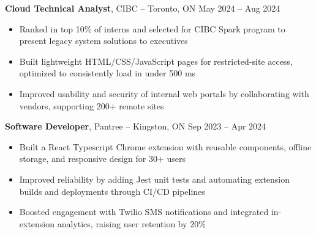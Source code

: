 \textbf{Cloud Technical Analyst}, {CIBC} -- Toronto, ON \hfill May 2024 -- Aug 2024 \\
\vspace{-5pt}
\begin{itemize}
  \item Ranked in top 10\% of interns and selected for CIBC Spark program to present legacy system solutions to executives
  \item Built lightweight HTML/CSS/JavaScript pages for restricted-site access, optimized to consistently load in under 500 ms
  \item Improved usability and security of internal web portals by collaborating with vendors, supporting 200+ remote sites
\end{itemize}
\textbf{Software Developer}, {Pantree} -- Kingston, ON \hfill Sep 2023 -- Apr 2024 \\
\vspace{-5pt}
\begin{itemize}
  \item Built a React Typescript Chrome extension with reusable components, offline storage, and responsive design for 30+ users
  \item Improved reliability by adding Jest unit tests and automating extension builds and deployments through CI/CD pipelines
  \item Boosted engagement with Twilio SMS notifications and integrated in-extension analytics, raising user retention by 20\%
\end{itemize}
